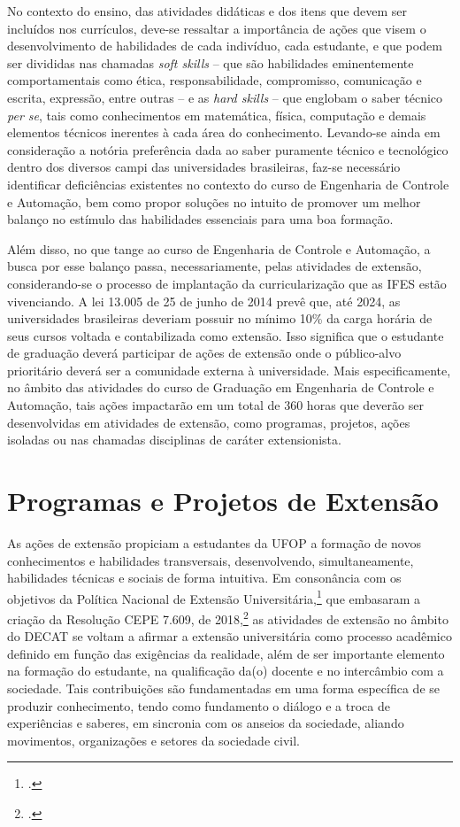 \documentclass[
	12pt,				%
	openright,			%
	oneside,			%
	a4paper,			%
	english,			%
	brazil				%
	]{abntex2}
\begin{document}
No contexto do ensino, das atividades didáticas e dos itens que devem ser incluídos nos currículos, deve-se ressaltar a importância de ações que visem o desenvolvimento de habilidades de cada indivíduo, cada estudante, e que podem ser divididas nas chamadas \textit{soft skills} -- que são habilidades eminentemente comportamentais como ética, responsabilidade, compromisso, comunicação e escrita, expressão, entre outras -- e as \textit{hard skills} -- que englobam o saber técnico \emph{per se}, tais como conhecimentos em matemática, física, computação e demais elementos técnicos inerentes à cada área do conhecimento. Levando-se ainda em consideração a notória preferência dada ao saber puramente técnico e tecnológico dentro dos diversos campi das universidades brasileiras, faz-se necessário identificar deficiências existentes no contexto do curso de Engenharia de Controle e Automação, bem como propor soluções no intuito de promover um melhor balanço no estímulo das habilidades essenciais para uma boa formação.

Além disso, no que tange ao curso de Engenharia de Controle e Automação, a busca por esse balanço passa, necessariamente, pelas atividades de extensão, considerando-se o processo de implantação da curricularização que as IFES estão vivenciando. A lei 13.005 de 25 de junho de 2014 prevê que, até 2024, as universidades brasileiras deveriam possuir no mínimo 10\% da carga horária de seus cursos voltada e contabilizada como extensão. Isso significa que o estudante de graduação deverá participar de ações de extensão onde o público-alvo prioritário deverá ser a comunidade externa à universidade. Mais especificamente, no âmbito das atividades do curso de Graduação em Engenharia de Controle e Automação, tais ações impactarão em um total de 360 horas que deverão ser desenvolvidas em atividades de extensão, como programas, projetos, ações isoladas ou nas chamadas disciplinas de caráter extensionista.

\section{Programas e Projetos de Extensão}
As ações de extensão propiciam a estudantes da UFOP a formação de novos conhecimentos e habilidades transversais, desenvolvendo, simultaneamente, habilidades técnicas e sociais de forma intuitiva. Em consonância com os objetivos da Política Nacional de Extensão Universitária,\footcite{forproex2012} que embasaram a criação da Resolução CEPE 7.609, de 2018,\footcite[Ver em][]{resolucao-cepe-7609} as atividades de extensão no âmbito do DECAT se voltam a afirmar a extensão universitária como processo acadêmico definido em função das exigências da realidade, além de ser importante elemento na formação do estudante, na qualificação da(o) docente e no intercâmbio com a sociedade. Tais contribuições são fundamentadas em uma forma específica de se produzir conhecimento, tendo como fundamento o  diálogo e a troca de experiências e saberes, em sincronia com os anseios da sociedade, aliando movimentos, organizações e setores da sociedade civil.
\end{document}

